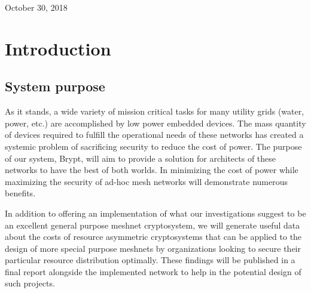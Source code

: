 \documentclass[tikz,a4paper,titlepage]{article}
\begin{document}
\begin{titlepage}

{\large October 30, 2018}\\[3cm] %




\vfill %

\end{titlepage}

\tableofcontents
\newpage

\section{Introduction}

\subsection{System purpose}
As it stands, a wide variety of mission critical tasks for many utility grids (water, power, etc.) are accomplished by low power embedded devices. The mass quantity of devices required to fulfill the operational needs of these networks has created a systemic problem of sacrificing security to reduce the cost of power. The purpose of our system, Brypt, will aim to provide a solution for architects of these networks to have the best of both worlds. In minimizing the cost of power while maximizing the security of ad-hoc mesh networks will demonstrate numerous benefits.

In addition to offering an implementation of what our investigations suggest to be an excellent general purpose meshnet cryptosystem, we will generate useful data about the costs of resource asymmetric cryptosystems that can be applied to the design of more special purpose meshnets by organizations looking to secure their particular resource distribution optimally. These findings will be published in a final report alongside the implemented network to help in the potential design of such projects.
\end{document}
